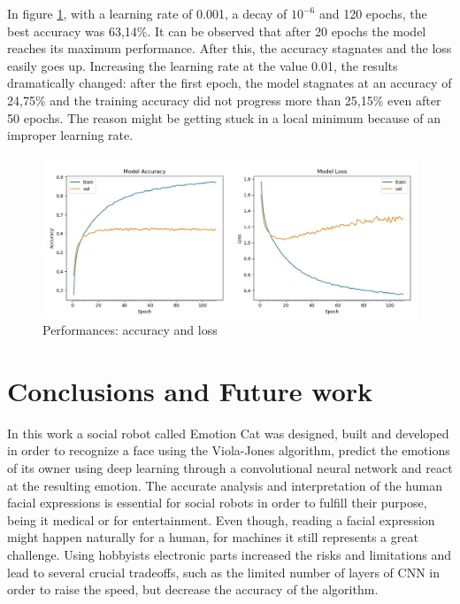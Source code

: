 \documentclass[runningheads,a4paper,12pt]{report}
\begin{document}
In figure \ref{fig:result1}, with a learning rate of 0.001, a decay of $10^{-6}$ and 120 epochs, the best accuracy was 63,14\%. It can be observed that after 20 epochs the model reaches its maximum performance. After this, the accuracy stagnates and the loss easily goes up. Increasing the learning rate at the value 0.01, the results dramatically changed: after the first epoch, the model stagnates at an accuracy of 24,75\% and the training accuracy did not progress more than 25,15\% even after 50 epochs. The reason might be getting stuck in a local minimum because of an improper learning rate. 

\begin{figure}[h]
	\centering
	\includegraphics[width=\linewidth]{./images/3_results1}\hfill	
	\caption{Performances: accuracy and loss}  
    \label{fig:result1}
\end{figure}


\chapter*{Conclusions and Future work}
In this work a social robot called Emotion Cat was designed, built and developed in order to recognize a face using the Viola-Jones algorithm, predict the emotions of its owner using deep learning through a convolutional neural network and react at the resulting emotion. The accurate analysis and interpretation of the human facial expressions is essential for social robots in order to fulfill their purpose, being it medical or for entertainment. Even though, reading a facial expression might happen naturally for a human, for machines it still represents a great challenge. Using hobbyists electronic parts increased the risks and limitations and lead to several crucial tradeoffs, such as the limited number of layers of CNN in order to raise the speed, but decrease the accuracy of the algorithm. 
\end{document}
